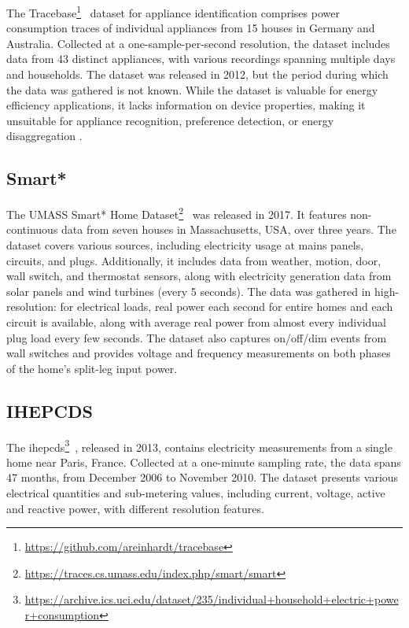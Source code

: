 The Tracebase\footnote{\url{https://github.com/areinhardt/tracebase}}~\parencite{reinhardt_accuracy_2012} dataset for appliance identification comprises power consumption traces of individual appliances from 15 houses in Germany and Australia. Collected at a one-sample-per-second resolution, the dataset includes data from 43 distinct appliances, with various recordings spanning multiple days and households. The dataset was released in 2012, but the period during which the data was gathered is not known. While the dataset is valuable for energy efficiency applications, it lacks information on device properties, making it unsuitable for appliance recognition, preference detection, or energy disaggregation \parencite{himeur_building_2020}.

\subsection{Smart*}

The UMASS Smart* Home Dataset\footnote{\url{https://traces.cs.umass.edu/index.php/smart/smart}}~\parencite{barker_smart_2012} was released in 2017. It features non-continuous data from seven houses in Massachusetts, USA, over three years. The dataset covers various sources, including electricity usage at mains panels, circuits, and plugs. Additionally, it includes data from weather, motion, door, wall switch, and thermostat sensors, along with electricity generation data from solar panels and wind turbines (every 5 seconds). The data was gathered in high-resolution: for electrical loads, real power each second for entire homes and each circuit is available, along with average real power from almost every individual plug load every few seconds. The dataset also captures on/off/dim events from wall switches and provides voltage and frequency measurements on both phases of the home’s split-leg input power.

\subsection{IHEPCDS}

The \acrlong{ihepcds}\footnote{\url{https://archive.ics.uci.edu/dataset/235/individual+household+electric+power+consumption}}~\parencite{georges_hebrail_individual_2006}, released in 2013, contains electricity measurements from a single home near Paris, France. Collected at a one-minute sampling rate, the data spans 47 months, from December 2006 to November 2010. The dataset presents various electrical quantities and sub-metering values, including current, voltage, active and reactive power, with different resolution features.

